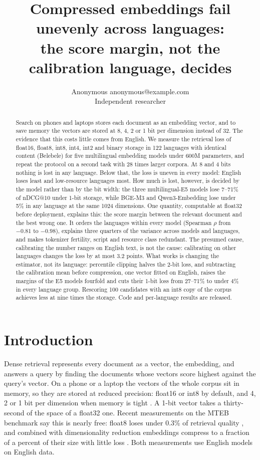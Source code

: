\documentclass[10pt]{article}
\title{Compressed embeddings fail unevenly across languages:\\the score margin, not the calibration language, decides}
\author{\name Anonymous \email anonymous@example.com \\
      \addr Independent researcher}
\begin{document}
\maketitle

\begin{abstract}
Search on phones and laptops stores each document as an embedding vector, and to save memory the vectors are stored at 8, 4, 2 or 1 bit per dimension instead of 32. The evidence that this costs little comes from English. We measure the retrieval loss of float16, float8, int8, int4, int2 and binary storage in 122 languages with identical content (Belebele) for five multilingual embedding models under 600M parameters, and repeat the protocol on a second task with 28 times larger corpora. At 8 and 4 bits nothing is lost in any language. Below that, the loss is uneven in every model: English loses least and low-resource languages most. How much is lost, however, is decided by the model rather than by the bit width: the three multilingual-E5 models lose 7--71\% of nDCG@10 under 1-bit storage, while BGE-M3 and Qwen3-Embedding lose under 5\% in any language at the same 1024 dimensions. One quantity, computable at float32 before deployment, explains this: the score margin between the relevant document and the best wrong one. It orders the languages within every model (Spearman $\rho$ from $-0.81$ to $-0.98$), explains three quarters of the variance across models and languages, and makes tokenizer fertility, script and resource class redundant. The presumed cause, calibrating the number ranges on English text, is not the cause: calibrating on other languages changes the loss by at most 3.2 points. What works is changing the estimator, not its language: percentile clipping halves the 2-bit loss, and subtracting the calibration mean before compression, one vector fitted on English, raises the margins of the E5 models fourfold and cuts their 1-bit loss from 27--71\% to under 4\% in every language group. Rescoring 100 candidates with an int8 copy of the corpus achieves less at nine times the storage. Code and per-language results are released.
\end{abstract}

\section{Introduction}
Dense retrieval represents every document as a vector, the embedding, and answers a query by finding the documents whose vectors score highest against the query's vector. On a phone or a laptop the vectors of the whole corpus sit in memory, so they are stored at reduced precision: float16 or int8 by default, and 4, 2 or 1 bit per dimension when memory is tight \citep{shakir2024quant,yamada2021bpr}. A 1-bit vector takes a thirty-second of the space of a float32 one. Recent measurements on the MTEB benchmark \citep{muennighoff2023mteb} say this is nearly free: float8 loses under 0.3\% of retrieval quality \citep{sanchez2025storage}, and combined with dimensionality reduction embeddings compress to a fraction of a percent of their size with little loss \citep{dimquant2026}. Both measurements use English models on English data.
\end{document}
